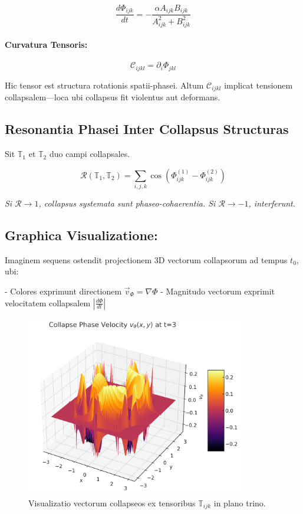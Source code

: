 \[
\frac{d\Phi_{ijk}}{dt} = -\frac{\alpha A_{ijk} B_{ijk}}{A_{ijk}^2 + B_{ijk}^2}
\]

\paragraph{Curvatura Tensoris:}

\[
\mathcal{C}_{ijkl} = \partial_i \Phi_{jkl}
\]

Hic tensor est structura rotationis spatii-phasei. Altum \( \mathcal{C}_{ijkl} \) implicat tensionem collapsalem—loca ubi collapsus fit violentus aut deformans.

\subsection*{Resonantia Phasei Inter Collapsus Structuras}

Sit \( \mathbb{T}_1 \) et \( \mathbb{T}_2 \) duo campi collapsales.

\[
\mathcal{R}(\mathbb{T}_1, \mathbb{T}_2) = \sum_{i,j,k} \cos\left( \Phi^{(1)}_{ijk} - \Phi^{(2)}_{ijk} \right)
\]

\textit{Si \( \mathcal{R} \to 1 \), collapsus systemata sunt phaseo-cohaerentia. Si \( \mathcal{R} \to -1 \), interferunt.}

\subsection*{Graphica Visualizatione:}

Imaginem sequens ostendit projectionem 3D vectorum collapsorum ad tempus \( t_0 \), ubi:

- Colores exprimunt directionem \( \vec{v}_\Phi = \nabla \Phi \)
- Magnitudo vectorum exprimit velocitatem collapsalem \( \left| \frac{d\Phi}{dt} \right| \)

\begin{figure}[H]
  \centering
  \includegraphics[width=0.85\textwidth]{images/output(4).png}
  \caption{Visualizatio vectorum collapseos ex tensoribus \( \mathbb{T}_{ijk} \) in plano trino.}
\end{figure}

